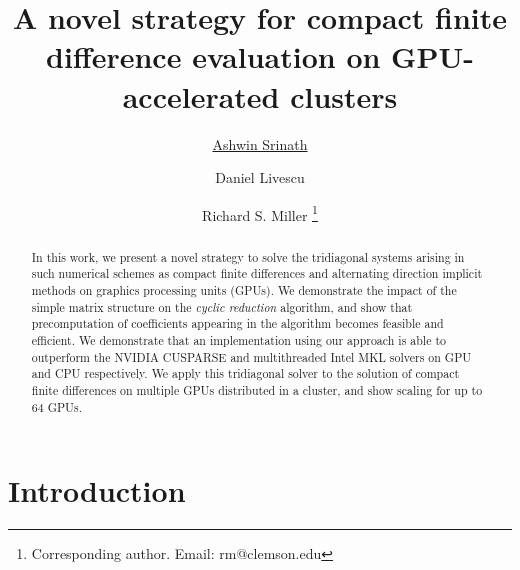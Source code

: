 \documentclass[letterpaper,10pt]{article}
\begin{document}
\title{A novel strategy for compact finite difference evaluation
on GPU-accelerated clusters}

\author[1]{\underline{Ashwin Srinath}}
\author[2]{Daniel Livescu}
\author[3]{Richard S. Miller \footnote{
Corresponding author. Email: rm@clemson.edu}}
\maketitle

\begin{abstract} 
In this work,
we present a novel strategy to solve the
tridiagonal systems arising in such numerical schemes
as compact finite differences
and alternating direction implicit methods
on graphics processing units (GPUs).
We demonstrate the impact of the simple matrix structure
on the \emph{cyclic reduction} algorithm,
and show that precomputation of coefficients appearing in the
algorithm becomes feasible and efficient.
We demonstrate that an implementation using our approach
is able to outperform
the NVIDIA CUSPARSE and multithreaded Intel MKL solvers
on GPU and CPU respectively.
We apply this tridiagonal solver
to the solution of
compact finite differences on multiple GPUs
distributed in a cluster,
and show scaling for up to 64 GPUs.

\end{abstract}

\section{Introduction}
\end{document}
